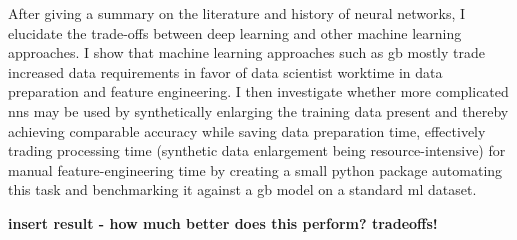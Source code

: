 
After giving a summary on the literature and history of neural networks, I elucidate the trade-offs between deep learning and other machine learning approaches. I show that machine learning approaches such as \ac{gb} mostly trade increased data requirements in favor of data scientist worktime in data preparation and feature engineering.
I then investigate whether more complicated \acp{nn} may be used by synthetically enlarging the training data present and thereby achieving comparable accuracy while saving data preparation time, effectively trading processing time (synthetic data enlargement being resource-intensive) for manual feature-engineering time by creating a small python package automating this task and benchmarking it against a \ac{gb} model on a standard \ac{ml} dataset.

\textbf{insert result - how much better does this perform? tradeoffs!}

